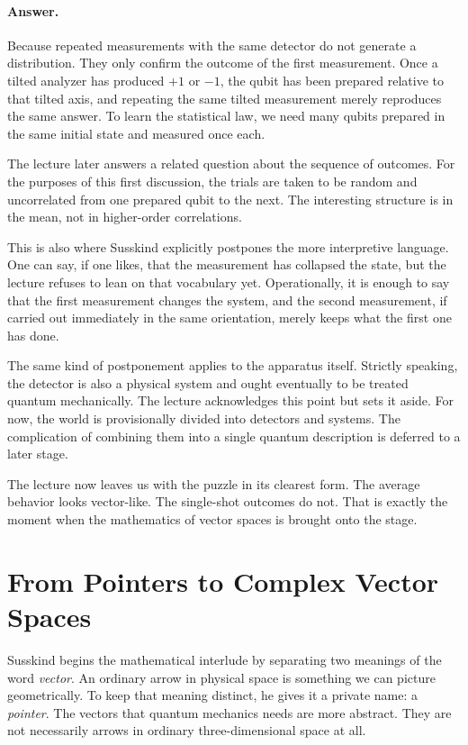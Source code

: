 \paragraph{Answer.} Because repeated measurements with the same detector do not generate a distribution. They only confirm the outcome of the first measurement. Once a tilted analyzer has produced \(+1\) or \(-1\), the qubit has been prepared relative to that tilted axis, and repeating the same tilted measurement merely reproduces the same answer. To learn the statistical law, we need many qubits prepared in the same initial state and measured once each.

The lecture later answers a related question about the sequence of outcomes. For the purposes of this first discussion, the trials are taken to be random and uncorrelated from one prepared qubit to the next. The interesting structure is in the mean, not in higher-order correlations.

This is also where Susskind explicitly postpones the more interpretive language. One can say, if one likes, that the measurement has collapsed the state, but the lecture refuses to lean on that vocabulary yet. Operationally, it is enough to say that the first measurement changes the system, and the second measurement, if carried out immediately in the same orientation, merely keeps what the first one has done.

The same kind of postponement applies to the apparatus itself. Strictly speaking, the detector is also a physical system and ought eventually to be treated quantum mechanically. The lecture acknowledges this point but sets it aside. For now, the world is provisionally divided into detectors and systems. The complication of combining them into a single quantum description is deferred to a later stage.

The lecture now leaves us with the puzzle in its clearest form. The average behavior looks vector-like. The single-shot outcomes do not. That is exactly the moment when the mathematics of vector spaces is brought onto the stage.

\section{From Pointers to Complex Vector Spaces}

Susskind begins the mathematical interlude by separating two meanings of the word \emph{vector}. An ordinary arrow in physical space is something we can picture geometrically. To keep that meaning distinct, he gives it a private name: a \emph{pointer}. The vectors that quantum mechanics needs are more abstract. They are not necessarily arrows in ordinary three-dimensional space at all.

